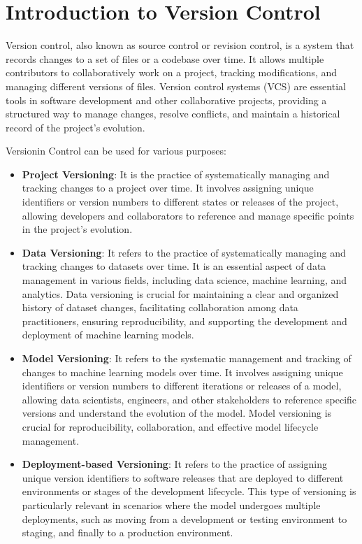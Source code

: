 \documentclass[12pt]{article}
\begin{document}
\section{Introduction to Version Control}

Version control, also known as source control or revision control, is a system that records changes to a set of files or a codebase over time. It allows multiple contributors to collaboratively work on a project, tracking modifications, and managing different versions of files. Version control systems (VCS) are essential tools in software development and other collaborative projects, providing a structured way to manage changes, resolve conflicts, and maintain a historical record of the project's evolution.

Versionin Control can be used for various purposes:
\begin{itemize}
    \item \textbf{Project Versioning}: It is the practice of systematically managing and tracking changes to a project over time. It involves assigning unique identifiers or version numbers to different states or releases of the project, allowing developers and collaborators to reference and manage specific points in the project's evolution.
    
    \item \textbf{Data Versioning}: It refers to the practice of systematically managing and tracking changes to datasets over time. It is an essential aspect of data management in various fields, including data science, machine learning, and analytics. Data versioning is crucial for maintaining a clear and organized history of dataset changes, facilitating collaboration among data practitioners, ensuring reproducibility, and supporting the development and deployment of machine learning models.
    
    \item \textbf{Model Versioning}: It refers to the systematic management and tracking of changes to machine learning models over time. It involves assigning unique identifiers or version numbers to different iterations or releases of a model, allowing data scientists, engineers, and other stakeholders to reference specific versions and understand the evolution of the model. Model versioning is crucial for reproducibility, collaboration, and effective model lifecycle management.
    
    \item \textbf{Deployment-based Versioning}: It refers to the practice of assigning unique version identifiers to software releases that are deployed to different environments or stages of the development lifecycle. This type of versioning is particularly relevant in scenarios where the model undergoes multiple deployments, such as moving from a development or testing environment to staging, and finally to a production environment.
\end{itemize}
\end{document}
